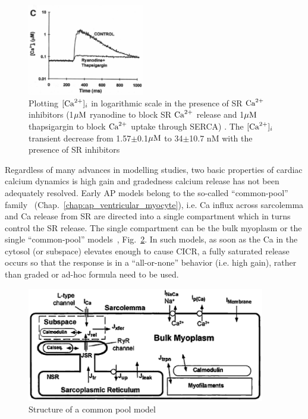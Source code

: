 \begin{figure}[hbt]
  \centerline{\includegraphics[height=4cm,
    angle=0]{./images/calcium_transient.eps}}
\caption{Plotting $[{\text{Ca}^{2+}}]_i$ in logarithmic scale in the presence of SR ${\text{Ca}^{2+}}$
inhibitors (1${\mu\text{M}}$ ryanodine to block SR ${\text{Ca}^{2+}}$ release and 1${\mu\text{M}}$ thapsigargin
to block ${\text{Ca}^{2+}}$ uptake through SERCA) \citep{cannell1994snu}. The $[{\text{Ca}^{2+}}]_i$
transient decrease from 1.57$\pm$0.1${\mu\text{M}}$ to 34$\pm$10.7 nM with the presence
of SR inhibitors}
\label{fig:calcium_transient}
\end{figure}

Regardless of many advances in modelling studies, two basic properties of
cardiac calcium dynamics is high gain and gradedness calcium release has not
been adequately resolved.
Early AP models belong to the so-called ``common-pool''
family~\citep{stern1992tec} (Chap.~\ref{chap:ap_ventricular_myocyte}), i.e. Ca
influx across sarcolemma and Ca release from SR are directed into a single
compartment which in turns control the SR release.
The single compartment can be the bulk myoplasm or the single ``common-pool''
models~\citep{jafri1998cad}, Fig.~\ref{fig:common_pool}.  In such models, as
soon as the Ca in the cytosol (or subspace) elevates enough to cause CICR, a
fully saturated release occurs so that the response is in a ``all-or-none''
behavior (i.e. high gain), rather than graded or ad-hoc formula need to be used.


\begin{figure}[hbt]
  \centerline{\includegraphics[height=5cm,
    angle=0]{./images/common_pool.eps}}
  \caption{Structure of a common pool model~\citep{jafri1998cad}}
  \label{fig:common_pool}
\end{figure}

